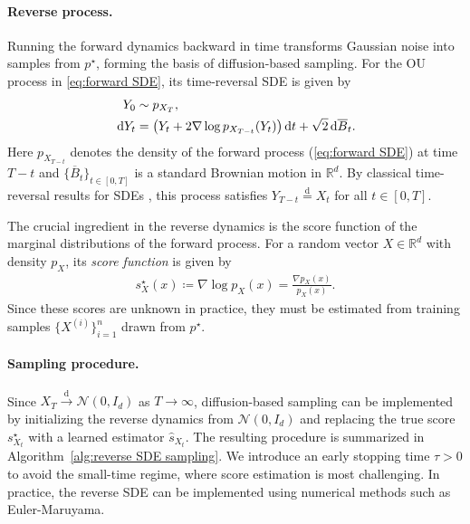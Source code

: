 \documentclass{article}
\newcommand{\defn}{\coloneqq}
\newcommand{\diff}{\,\mathrm{d}}
\newcommand{\disteq}{\overset{\mathrm d}=}
\theoremstyle{plain}
\theoremstyle{remark}
\begin{document}
\paragraph*{Reverse process.}
Running the forward dynamics backward in time transforms Gaussian noise into samples from $p^\star$, forming the basis of diffusion-based sampling. For the OU process in \eqref{eq:forward SDE}, its time-reversal SDE is given by
\begin{align}
    Y_0 &\sim p_{X_T}, \notag\\
    \diff Y_t &= \big(Y_t + 2\nabla \log p_{X_{T-t}}(Y_t)\big) \diff t + \sqrt{2} \diff \overline{B}_t.
    \label{eq:reverse SDE}
\end{align}
Here $p_{X_{T-t}}$ denotes the density of the forward process (\ref{eq:forward SDE}) at time $T-t$ and $\{ \overline{B}_t\}_{t\in [0,T]}$ is a standard Brownian motion in $\mathbb{R}^d$. By classical time-reversal results for SDEs \citep{ANDERSON1982313}, this process satisfies $Y_{T-t}\disteq X_t$ for all $t\in[0,T]$.


The crucial ingredient in the reverse dynamics is the score function of the marginal distributions of the forward process. For a random vector $X \in \mathbb{R}^d$ with density $p_X$, its \textit{score function} is given by
\begin{align}
    s^\star_{X}(x) \defn \nabla \log p_{X}(x) = \frac{\nabla p_{X}(x)}{p_{X}(x)}. \label{eq:score function}
\end{align}
Since these scores are unknown in practice, they must be estimated from training samples $\{X^{(i)}\}_{i=1}^n$ drawn from $p^\star$.



\paragraph*{Sampling procedure.}
Since $X_T\overset{\mathrm d}{\to}\mathcal{N}(0,I_d)$ as $T\to\infty$, diffusion-based sampling can be implemented by initializing the reverse dynamics from $\mathcal{N}(0,I_d)$ and replacing the true score $s_{X_t}^\star$ with a learned estimator $\widehat{s}_{X_t}$. 
The resulting procedure is summarized in Algorithm~\ref{alg:reverse SDE sampling}. 
We introduce an early stopping time $\tau>0$ to avoid the small-time regime, where score estimation is most challenging. In practice, the reverse SDE can be implemented using numerical methods such as Euler-Maruyama.
\end{document}
